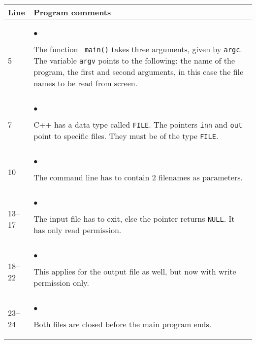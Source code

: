 {\small
\begin{center}
\begin{tabular}{|ll|}\hline
\hfill Line \hfill
& \hspace*{\fill} Program comments \hspace*{\fill} \\ \hline
&  \\[-2mm]
5 &$\bullet$
\begin{minipage}[t]{0.65\textwidth}
The function \verb? main()? takes three arguments, given by \verb?argc?.
The variable \verb?argv? points to the following: the name of the program, the first and second
arguments, in this case the file names to be read from screen.\vspace*{2mm} 
\end{minipage}\\
7 &$\bullet$
\begin{minipage}[t]{0.65\textwidth}
C++ has a data type called \verb?FILE?. The pointers \verb?inn? 
and \verb ?out? point to specific files. They must be of the type
\verb?FILE?.
\vspace*{2mm}
\end{minipage}\\
10 &$\bullet$
\begin{minipage}[t]{0.65\textwidth}
The command line has to contain 2 filenames as parameters.
\end{minipage}\\
13--17 &$\bullet$
\begin{minipage}[t]{0.65\textwidth}
The input file has to exit, else the pointer returns \verb?NULL?.
It has only read permission.
\end{minipage}\\
18--22 &$\bullet$
\begin{minipage}[t]{0.65\textwidth}
This applies for the output file as well, but now with write permission only.
\end{minipage}\\ 
23--24 &$\bullet$
\begin{minipage}[t]{0.65\textwidth}
Both files are closed before the main program ends.
\end{minipage}\\[2ex]
\hline
\end{tabular}
\end{center}
} %
%

